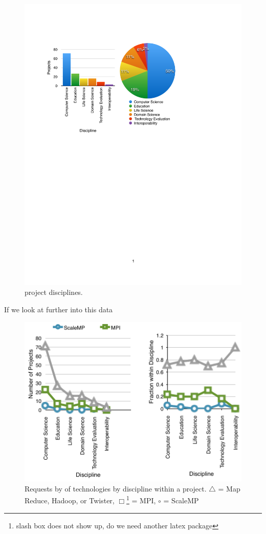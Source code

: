 \begin{figure}[htb]
  \centering
    \includegraphics[width=1.0\textwidth]{images/project-disciplines.pdf}
  \caption{project disciplines.}
  \label{F:freq-dis}
\end{figure}

If we look at further into this data 

\begin{figure}[htb]
  \centering
    \includegraphics[width=1.0\textwidth]{images/trend-b.pdf}
  \caption{Requests by of technologies by discipline within a
    project. $\bigtriangleup$ = Map Reduce, Hadoop, or Twister,
    $\Box$\footnote{slash box does not show up, do we need another
      latex package}
  = MPI, $\circ$ = ScaleMP}
\end{figure}



